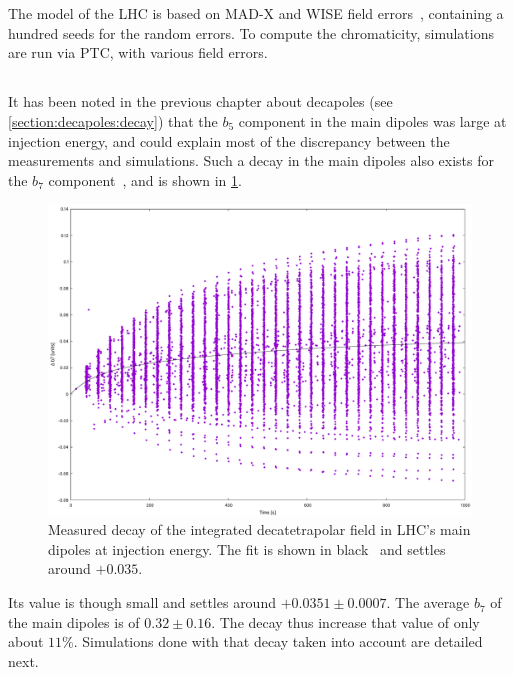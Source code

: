 \section{}
\label{sec:nl_chroma_model}


The model of the LHC is based on MAD-X and WISE field errors~\cite{p_hagen_wise_2006}, containing
a hundred seeds for the random errors. To compute the chromaticity, simulations are run via PTC,
with various field errors.


\subsection{}

It has been noted in the previous chapter about decapoles (see \cref{section:decapoles:decay}) that
the $b_5$ component in the main dipoles was large at injection energy, and could explain most of the
discrepancy between the measurements and simulations.
Such a decay in the main dipoles also exists for the $b_7$ component~\cite{deniau2024private}, and
is shown in \cref{fig:high_orders:b7_decay}. 

\begin{figure}[!htb]
    \centering
    \includegraphics[width=0.9\columnwidth]{images/decay_b7.pdf}
    \caption{Measured decay of the integrated decatetrapolar field in LHC's main dipoles at
    injection energy. The fit is shown in black~\cite{deniau2024private} and settles around
    $+0.035$.}
    \label{fig:high_orders:b7_decay}
\end{figure}

Its value is though small and settles around $+0.0351 \pm 0.0007$. The average $b_7$ of the main
dipoles is of $0.32 \pm 0.16$. The decay thus increase that value of only about $11\%$.
Simulations done with that decay taken into account are detailed next.



